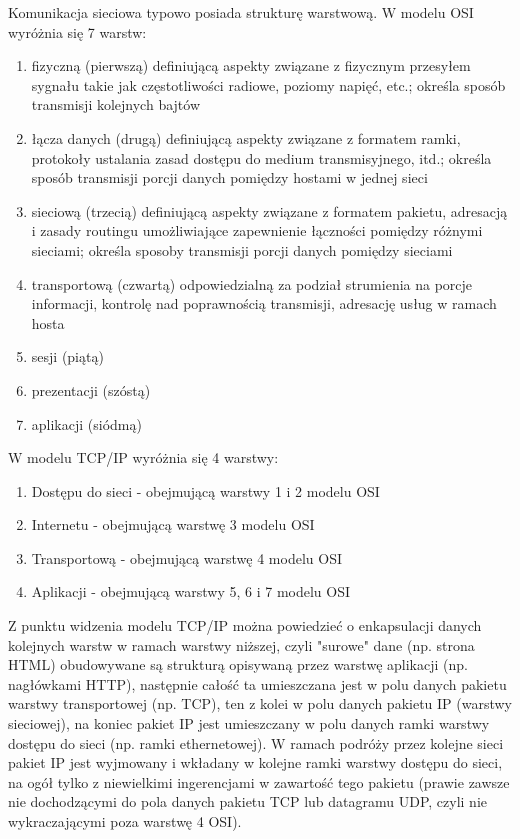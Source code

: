 \documentclass{pdfBooklets}
\begin{document}
Komunikacja sieciowa typowo posiada strukturę warstwową. W modelu OSI wyróżnia się 7 warstw:
\begin{enumerate}
	\item fizyczną (pierwszą) definiującą aspekty związane z fizycznym przesyłem sygnału takie jak częstotliwości radiowe, poziomy napięć, etc.;
		określa sposób transmisji kolejnych bajtów
	\item łącza danych (drugą) definiującą aspekty związane z formatem ramki, protokoły ustalania zasad dostępu do medium transmisyjnego, itd.;
		określa sposób transmisji porcji danych pomiędzy hostami w jednej sieci
	\item sieciową (trzecią) definiującą aspekty związane z formatem pakietu, adresacją i zasady routingu umożliwiające zapewnienie łączności pomiędzy różnymi sieciami;
		określa sposoby transmisji porcji danych pomiędzy sieciami
	\item transportową (czwartą) odpowiedzialną za podział strumienia na porcje informacji, kontrolę nad poprawnością transmisji, adresację usług w ramach hosta
	\item sesji (piątą)
	\item prezentacji (szóstą)
	\item aplikacji (siódmą)
\end{enumerate}
W modelu TCP/IP wyróżnia się 4 warstwy:
\begin{enumerate}
	\item Dostępu do sieci - obejmującą warstwy 1 i 2 modelu OSI
	\item Internetu - obejmującą warstwę 3 modelu OSI
	\item Transportową - obejmującą warstwę 4 modelu OSI
	\item Aplikacji - obejmującą warstwy 5, 6 i 7 modelu OSI
\end{enumerate}

Z punktu widzenia modelu TCP/IP można powiedzieć o enkapsulacji danych kolejnych warstw w ramach warstwy niższej, czyli "surowe" dane (np. strona HTML) obudowywane są strukturą opisywaną przez warstwę aplikacji (np. nagłówkami HTTP), następnie całość ta umieszczana jest w polu danych pakietu warstwy transportowej (np. TCP), ten z kolei w polu danych pakietu IP (warstwy sieciowej), na koniec pakiet IP jest umieszczany w polu danych ramki warstwy dostępu do sieci (np. ramki ethernetowej). W ramach podróży przez kolejne sieci pakiet IP jest wyjmowany i wkładany w kolejne ramki warstwy dostępu do sieci, na ogół tylko z niewielkimi ingerencjami w zawartość tego pakietu (prawie zawsze nie dochodzącymi do pola danych pakietu TCP lub datagramu UDP, czyli nie wykraczającymi poza warstwę 4 OSI).
\end{document}
